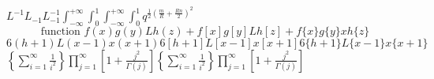 \documentclass[11pt,fleqn]{article}
\begin{document}
    $L^{-1}L_{-1}L_{-1}^{-1}\int_{-\infty}^{+\infty}\int_0^1\displaystyle \int_{-\infty}^{+\infty}\int_0^1q^{\frac12\left(\frac mR+\frac {Rn}2\right)^2}$
    \[\textrm{function }f(x)g(y)Lh(z)+f[x]g[y]Lh[z]+f\{x\}g\{y\}xh\{z\}\]
    \[6(h+1)L(x-1)x(x+1)6[h+1]L[x-1]x[x+1]6\{h+1\}L\{x-1\}x\{x+1\}\]
    $\left\{\sum_{i=1}^\infty\frac 1{i^2}\right\}\prod_{j=1}^\infty\left[1+\frac{j^2}{\Gamma(j)}\right]\displaystyle \left\{\sum_{i=1}^\infty\frac 1{i^2}\right\}\prod_{j=1}^\infty\left[1+\frac{j^2}{\Gamma(j)}\right]$
\end{document}
